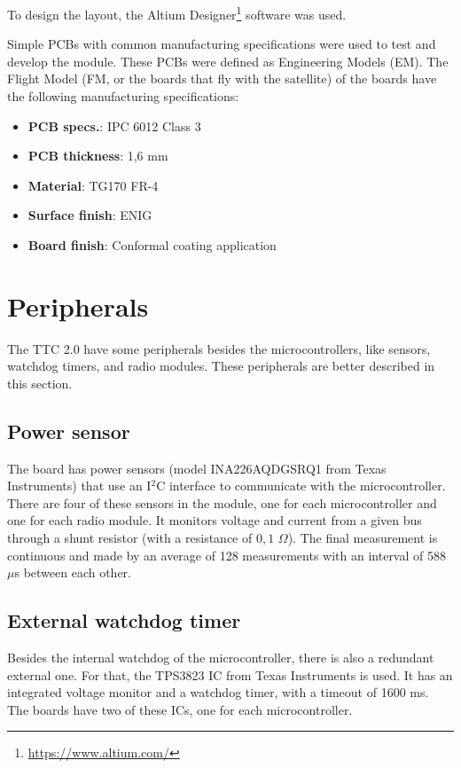To design the layout, the Altium Designer\footnote{\href{https://www.altium.com/}{https://www.altium.com/}} software was used.

Simple PCBs with common manufacturing specifications were used to test and develop the module. These PCBs were defined as Engineering Models (EM). The Flight Model (FM, or the boards that fly with the satellite) of the boards have the following manufacturing specifications:

\begin{itemize}
    \item \textbf{PCB specs.}: IPC 6012 Class 3
    \item \textbf{PCB thickness}: 1,6 mm
    \item \textbf{Material}: TG170 FR-4
    \item \textbf{Surface finish}: ENIG
    \item \textbf{Board finish}: Conformal coating application
\end{itemize}

\section{Peripherals}

The TTC 2.0 have some peripherals besides the microcontrollers, like sensors, watchdog timers, and radio modules. These peripherals are better described in this section.

\subsection{Power sensor}

The board has power sensors (model INA226AQDGSRQ1 from Texas Instruments) that use an I$^{2}$C interface to communicate with the microcontroller. There are four of these sensors in the module, one for each microcontroller and one for each radio module. It monitors voltage and current from a given bus through a shunt resistor (with a resistance of $0,1$ $\Omega$). The final measurement is continuous and made by an average of 128 measurements with an interval of 588 $\mu$s between each other.

\subsection{External watchdog timer}

Besides the internal watchdog of the microcontroller, there is also a redundant external one. For that, the TPS3823 IC from Texas Instruments is used. It has an integrated voltage monitor and a watchdog timer, with a timeout of 1600 ms. The boards have two of these ICs, one for each microcontroller.

